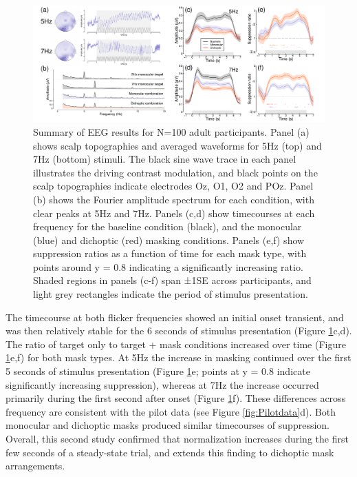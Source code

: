 \documentclass[
]{article}
\begin{document}
\begin{figure}

{\centering \includegraphics{Figures/EEGdata} 

}

\caption{Summary of EEG results for N=100 adult participants. Panel (a) shows scalp topographies and averaged waveforms for 5Hz (top) and 7Hz (bottom) stimuli. The black sine wave trace in each panel illustrates the driving contrast modulation, and black points on the scalp topographies indicate electrodes Oz, O1, O2 and POz. Panel (b) shows the Fourier amplitude spectrum for each condition, with clear peaks at 5Hz and 7Hz. Panels (c,d) show timecourses at each frequency for the baseline condition (black), and the monocular (blue) and dichoptic (red) masking conditions. Panels (e,f) show suppression ratios as a function of time for each mask type, with points around y = 0.8 indicating a significantly increasing ratio. Shaded regions in panels (c-f) span ±1SE across participants, and light grey rectangles indicate the period of stimulus presentation.}\label{fig:EEGdata}
\end{figure}

The timecourse at both flicker frequencies showed an initial onset transient, and was then relatively stable for the 6 seconds of stimulus presentation (Figure \ref{fig:EEGdata}c,d). The ratio of target only to target + mask conditions increased over time (Figure \ref{fig:EEGdata}e,f) for both mask types. At 5Hz the increase in masking continued over the first 5 seconds of stimulus presentation (Figure \ref{fig:EEGdata}e; points at y = 0.8 indicate significantly increasing suppression), whereas at 7Hz the increase occurred primarily during the first second after onset (Figure \ref{fig:EEGdata}f). These differences across frequency are consistent with the pilot data (see Figure \ref{fig:Pilotdata}d). Both monocular and dichoptic masks produced similar timecourses of suppression. Overall, this second study confirmed that normalization increases during the first few seconds of a steady-state trial, and extends this finding to dichoptic mask arrangements.
\end{document}
